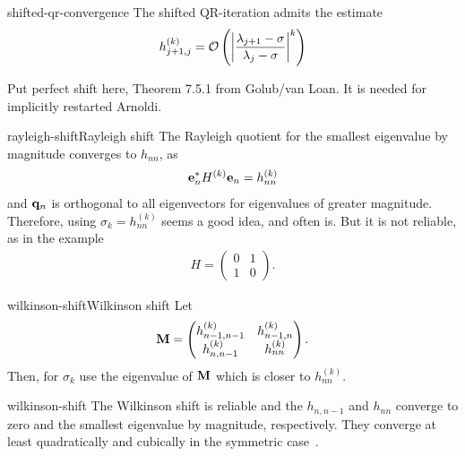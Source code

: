 \begin{Lemma}{shifted-qr-convergence}
  The shifted QR-iteration admits the estimate
  \begin{gather}
    h_{j+1,j}^{(k)} = \bigo \left(\abs*{\frac{\lambda_{j+1}-\sigma}{\lambda_j-\sigma}}^k\right)
  \end{gather}
\end{Lemma}

\begin{todo}
  Put perfect shift here, Theorem 7.5.1 from Golub/van Loan. It is needed for implicitly restarted Arnoldi.
\end{todo}

\begin{Example*}{rayleigh-shift}{Rayleigh shift}
  The Rayleigh quotient for the smallest eigenvalue by magnitude
  converges to $h_{nn}$, as
  \begin{gather}
    \ve_n^* H^{(k)} \ve_n = h_{nn}^{(k)}
  \end{gather}
  and $\vq_n$ is orthogonal to all eigenvectors for eigenvalues of
  greater magnitude. Therefore, using $\sigma_k = h_{nn}^{(k)}$ seems
  a good idea, and often is. But it is not reliable, as in the example
  \begin{gather}
    H =
    \begin{pmatrix}
      0 & 1 \\ 1 & 0
    \end{pmatrix}.
  \end{gather}
\end{Example*}

\begin{Definition*}{wilkinson-shift}{Wilkinson shift}
  Let
  \begin{gather}
    \matm =
    \begin{pmatrix}
      h_{n-1,n-1}^{(k)}&h_{n-1,n}^{(k)}\\h_{n,n-1}^{(k)}&h_{nn}^{(k)}
    \end{pmatrix}.
  \end{gather}
  Then, for $\sigma_k$ use the eigenvalue of $\matm$ which is closer
  to $h_{nn}^{(k)}$.
\end{Definition*}

\begin{Remark}{wilkinson-shift}
  The Wilkinson shift is reliable and the $h_{n,n-1}$ and $h_{nn}$
  converge to zero and the smallest eigenvalue by magnitude,
  respectively. They converge at least quadratically and cubically in
  the symmetric case~\cite[Section 8.2]{GolubVanLoan83}.
\end{Remark}

